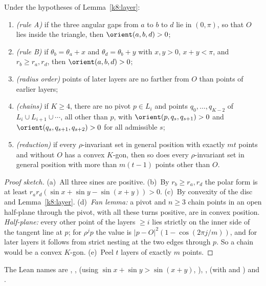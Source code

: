 \begin{lemma}\label{k8:facts}
Under the hypotheses of Lemma~\ref{k8:layer}:
\begin{enumerate}[label=(\alph*)]
\item\emph{(rule A)} if the three angular gaps from $a$ to $b$ to $d$ lie in $(0,\pi)$, so that $O$ lies inside the
triangle, then $\orient(a,b,d)>0$;
\item\emph{(rule B)} if $\theta_b=\theta_a+x$ and $\theta_d=\theta_b+y$ with $x,y>0$, $x+y<\pi$, and $r_b\ge
r_a,r_d$, then $\orient(a,b,d)>0$;
\item\emph{(radius order)} points of later layers are no farther from $O$ than points of earlier layers;
\item\emph{(chains)} if $K\ge4$, there are no pivot $p\in L_i$ and points $q_0,\dots,q_{K-2}$ of
$L_i\cup L_{i+1}\cup\cdots$, all other than $p$, with $\orient(p,q_s,q_{s+1})>0$ and $\orient(q_s,q_{s+1},q_{s+2})>0$
for all admissible $s$;
\item\emph{(reduction)} if every $\rho$-invariant set in general position with exactly $mt$ points and without $O$ has
a convex $K$-gon, then so does every $\rho$-invariant set in general position with more than $m(t-1)$ points other than
$O$.
\end{enumerate}
\end{lemma}

\begin{proof}[Proof sketch]
(a)~All three sines are positive. (b)~By $r_b\ge r_a,r_d$ the polar form is at least
$r_ar_d(\sin x+\sin y-\sin(x+y))>0$. (c)~By convexity of the disc and Lemma~\ref{k8:layer}. (d)~\emph{Fan lemma:} a
pivot and $n\ge3$ chain points in an open half-plane through the pivot, with all these turns positive, are in convex
position. \emph{Half-plane:} every other point of the layers $\ge i$ lies strictly on the inner side of the tangent line
at $p$; for $\rho^jp$ the value is $|p-O|^2(1-\cos(2\pi j/m))$, and for later layers it follows from strict nesting at
the two edges through $p$. So a chain would be a convex $K$-gon. (e)~Peel $t$ layers of exactly $m$ points.
\end{proof}

The Lean names are , ,  (using
$\sin x+\sin y>\sin(x+y)$, ), ,  (with
 and ) and .

